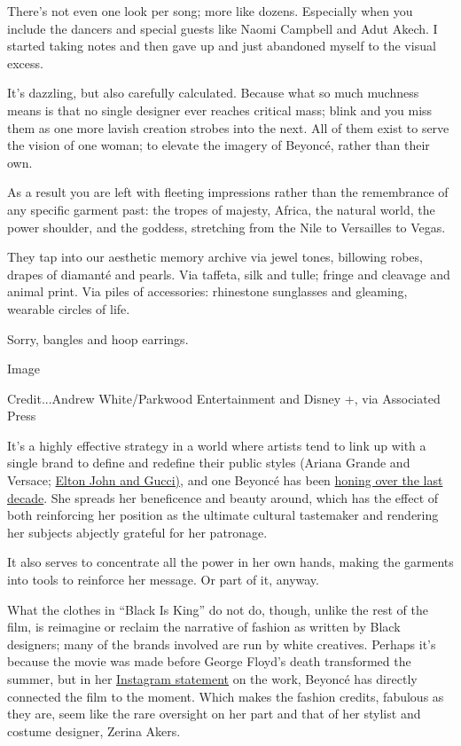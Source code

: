 There's not even one look per song; more like dozens. Especially when
you include the dancers and special guests like Naomi Campbell and Adut
Akech. I started taking notes and then gave up and just abandoned myself
to the visual excess.

It's dazzling, but also carefully calculated. Because what so much
muchness means is that no single designer ever reaches critical mass;
blink and you miss them as one more lavish creation strobes into the
next. All of them exist to serve the vision of one woman; to elevate the
imagery of Beyoncé, rather than their own.

As a result you are left with fleeting impressions rather than the
remembrance of any specific garment past: the tropes of majesty, Africa,
the natural world, the power shoulder, and the goddess, stretching from
the Nile to Versailles to Vegas.

They tap into our aesthetic memory archive via jewel tones, billowing
robes, drapes of diamanté and pearls. Via taffeta, silk and tulle;
fringe and cleavage and animal print. Via piles of accessories:
rhinestone sunglasses and gleaming, wearable circles of life.

Sorry, bangles and hoop earrings.

Image

Credit...Andrew White/Parkwood Entertainment and Disney +, via
Associated Press

It's a highly effective strategy in a world where artists tend to link
up with a single brand to define and redefine their public styles
(Ariana Grande and Versace;
\href{https://www.nytimes.com/2018/09/07/style/elton-john-farewell-tour-wardrobe-gucci.html}{Elton
John and Gucci)}, and one Beyoncé has been
\href{https://www.nytimes.com/2016/04/26/fashion/fashion-beyonce-lemonade.html}{honing
over the last decade}. She spreads her beneficence and beauty around,
which has the effect of both reinforcing her position as the ultimate
cultural tastemaker and rendering her subjects abjectly grateful for her
patronage.

It also serves to concentrate all the power in her own hands, making the
garments into tools to reinforce her message. Or part of it, anyway.

What the clothes in ``Black Is King'' do not do, though, unlike the rest
of the film, is reimagine or reclaim the narrative of fashion as written
by Black designers; many of the brands involved are run by white
creatives. Perhaps it's because the movie was made before George Floyd's
death transformed the summer, but in her
\href{https://www.instagram.com/p/CCAMxfrHjAL/}{Instagram statement} on
the work, Beyoncé has directly connected the film to the moment. Which
makes the fashion credits, fabulous as they are, seem like the rare
oversight on her part and that of her stylist and costume designer,
Zerina Akers.

